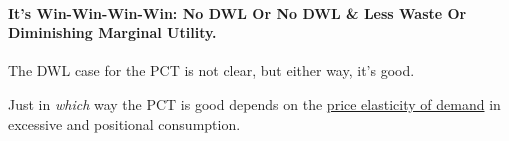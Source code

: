 




\paragraph{It's Win-Win-Win-Win: No DWL Or No DWL \& Less Waste Or Diminishing Marginal Utility.}  \label{sec:WinWin} The DWL case for the PCT is not clear, but either way, it's good.

Just in \emph{which} way the PCT is good depends on the \hyperref[eq:PED]{price elasticity of demand} in excessive and positional consumption.


